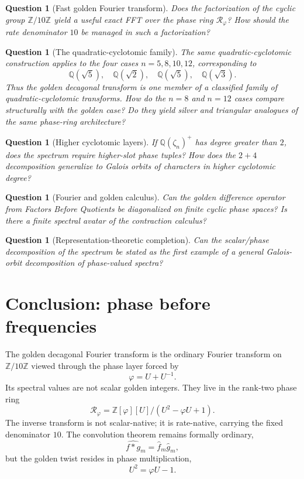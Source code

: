 \documentclass[11pt]{article}
\newtheorem{question}[definition]{Question}
\newcommand{\ph}{\varphi}
\newcommand{\Z}{\mathbb{Z}}
\newcommand{\Q}{\mathbb{Q}}
\newcommand{\RR}{\mathcal R_\ph}
\newcommand{\zz}{\zeta}
\begin{document}
\begin{question}[Fast golden Fourier transform]
Does the factorization of the cyclic group $\Z/10\Z$ yield a useful exact FFT over the phase ring $\RR$?  How should the rate denominator $10$ be managed in such a factorization?
\end{question}

\begin{question}[The quadratic-cyclotomic family]
The same quadratic-cyclotomic construction applies to the four cases $n=5,8,10,12$, corresponding to
\[
    \Q(\sqrt5),\quad \Q(\sqrt2),\quad \Q(\sqrt5),\quad \Q(\sqrt3).
\]
Thus the golden decagonal transform is one member of a classified family of quadratic-cyclotomic transforms.  How do the $n=8$ and $n=12$ cases compare structurally with the golden case?  Do they yield silver and triangular analogues of the same phase-ring architecture?
\end{question}

\begin{question}[Higher cyclotomic layers]
If $\Q(\zz_n)^+$ has degree greater than $2$, does the spectrum require higher-slot phase tuples?  How does the $2+4$ decomposition generalize to Galois orbits of characters in higher cyclotomic degree?
\end{question}

\begin{question}[Fourier and golden calculus]
Can the golden difference operator from \emph{Factors Before Quotients} be diagonalized on finite cyclic phase spaces?  Is there a finite spectral avatar of the contraction calculus?
\end{question}

\begin{question}[Representation-theoretic completion]
Can the scalar/phase decomposition of the spectrum be stated as the first example of a general Galois-orbit decomposition of phase-valued spectra?
\end{question}

\section{Conclusion: phase before frequencies}

The golden decagonal Fourier transform is the ordinary Fourier transform on $\Z/10\Z$ viewed through the phase layer forced by
\[
    \ph=U+U^{-1}.
\]
Its spectral values are not scalar golden integers.  They live in the rank-two phase ring
\[
    \RR=\Z[\ph][U]/(U^2-\ph U+1).
\]
The inverse transform is not scalar-native; it is rate-native, carrying the fixed denominator $10$.  The convolution theorem remains formally ordinary,
\[
    \widehat{f*g}_m=\widehat f_m\widehat g_m,
\]
but the golden twist resides in phase multiplication,
\[
    U^2=\ph U-1.
\]
\end{document}
